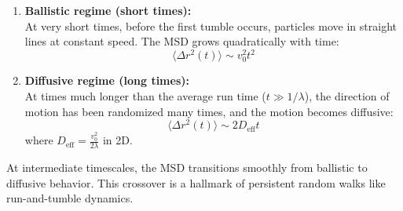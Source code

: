 \documentclass[
  letterpaper,
  enabledeprecatedfontcommands]{report}
\begin{document}
\begin{enumerate}
\def\labelenumi{\arabic{enumi}.}
\item
  \textbf{Ballistic regime (short times):}\\
  At very short times, before the first tumble occurs, particles move in
  straight lines at constant speed. The MSD grows quadratically with
  time: \[
   \langle \Delta r^2(t) \rangle \sim v_0^2 t^2
   \]
\item
  \textbf{Diffusive regime (long times):}\\
  At times much longer than the average run time (\(t \gg 1/\lambda\)),
  the direction of motion has been randomized many times, and the motion
  becomes diffusive: \[
   \langle \Delta r^2(t) \rangle \sim 2 D_{\text{eff}} t
   \] where \(D_{\text{eff}} = \frac{v_0^2}{2\lambda}\) in 2D.
\end{enumerate}

At intermediate timescales, the MSD transitions smoothly from ballistic
to diffusive behavior. This crossover is a hallmark of persistent random
walks like run-and-tumble dynamics.
\end{document}

